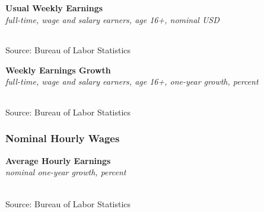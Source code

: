 \documentclass{report}
\makeatletter
\newcommand{\tbllink}[1]{\href{https://raw.githubusercontent.com/bdecon/US-chartbook/master/chartbook/data/#1}{\faTable}}
\newcommand*\short[1]{\expandafter\@gobbletwo\number\numexpr#1\relax}
\newcommand{\dateaxisticks}{
		date coordinates in=x, axis line style={draw=none},
		xmax={2022-01-30},
		max space between ticks=40,	    
		xtick={{1990-01-01}, {1992-01-01}, {1994-01-01}, 
			{1996-01-01}, {1998-01-01}, {2000-01-01}, 
			{2002-01-01}, {2004-01-01}, {2006-01-01},
			{2008-01-01}, {2010-01-01}, {2012-01-01}, {2014-01-01},
		    {2016-01-01}, {2018-01-01}, {2020-01-01}, {2022-01-01}},
		minor xtick={{1989-01-01}, {1991-01-01}, {1993-01-01},
			{1995-01-01}, {1997-01-01}, {1999-01-01}, 
			{2001-01-01}, {2003-01-01}, {2005-01-01}, {2007-01-01},
		    {2009-01-01}, {2011-01-01}, {2013-01-01}, {2015-01-01},
		    {2017-01-01}, {2019-01-01}, {2021-01-01}},
		enlarge y limits={0.06}, enlarge x limits={0.01},
		}
\newcommand{\bbar}[2]{extra #1 ticks = {{#2}}, extra #1 tick labels = ,
		extra #1 tick style = {grid=major, grid style={thick, black!25}},}
\newcommand{\thinline}[4]{\addplot[no markers, color=#1] 
		table [x=#2, y=#3, col sep=comma] {#4};	}
\newcommand{\thickline}[4]{\addplot[ultra thick, no markers, color=#1] 
		table [x=#2, y=#3, col sep=comma] {#4};	}
\newcommand{\rbars}{
		\fill[color=black!10] (axis cs:{1990-07-01},\pgfkeysvalueof{/pgfplots/ymin}) rectangle 
			(axis cs:{1991-03-01}, \pgfkeysvalueof{/pgfplots/ymax});
		\fill[color=black!10] (axis cs:{2007-12-01},\pgfkeysvalueof{/pgfplots/ymin}) rectangle 
			(axis cs:{2009-07-01}, \pgfkeysvalueof{/pgfplots/ymax});
		\fill[color=black!10] (axis cs:{2001-03-01},\pgfkeysvalueof{/pgfplots/ymin}) rectangle 
			(axis cs:{2001-11-01}, \pgfkeysvalueof{/pgfplots/ymax});
		\fill[color=black!10] (axis cs:{2020-02-01},\pgfkeysvalueof{/pgfplots/ymin}) rectangle 
			(axis cs:{2020-05-01}, \pgfkeysvalueof{/pgfplots/ymax});}
\makeatother
\begin{document}
{{\begin{minipage}{0.76\textwidth}
\normalsize \textbf{Usual Weekly Earnings}\\
\footnotesize{\textit{full-time, wage and salary earners, age 16+, nominal USD}}\\
 \setlength{\tabcolsep}{3.1pt} \color{black!90}
		{\renewcommand{\arraystretch}{1.55}
		 \begin{tabular}{p{19mm} R{8.8mm} R{8.8mm} R{8.8mm} R{8.8mm} R{8.8mm} R{8.8mm} 
		   R{8.8mm} R{8.8mm} R{8.8mm} R{8.8mm}}
			  \hline
		\end{tabular}}
\vspace{-2mm}
		
\footnotesize{Source: Bureau of Labor Statistics}
\vspace{4mm}

\normalsize \textbf{Weekly Earnings Growth}\\
\footnotesize{\textit{full-time, wage and salary earners, age 16+, one-year growth, percent}}\\
 \setlength{\tabcolsep}{3.1pt} \color{black!90}
	{\renewcommand{\arraystretch}{1.55}
		\begin{tabular}{p{19mm} R{8.8mm} R{8.8mm} R{8.8mm} R{8.8mm} R{8.8mm} R{8.8mm} 
		   R{8.8mm} R{8.8mm} R{8.8mm} R{8.8mm}}
			  \hline
		\end{tabular}}\vspace{-2mm}
				
\footnotesize{Source: Bureau of Labor Statistics}
\end{minipage}
\newpage
\subsubsection*{\color{black!70} \seriffont Nominal Hourly Wages}
\begin{minipage}{0.76\textwidth}
\small 
\vspace{2mm}

\normalsize \textbf{Average Hourly Earnings}\\
\footnotesize{\textit{nominal one-year growth, percent}}\\
\hspace*{-2mm} \\
\footnotesize{Source: Bureau of Labor Statistics} \hfill \tbllink{ahe.csv}
\vspace{3mm}


\end{minipage}}}
\end{document}
